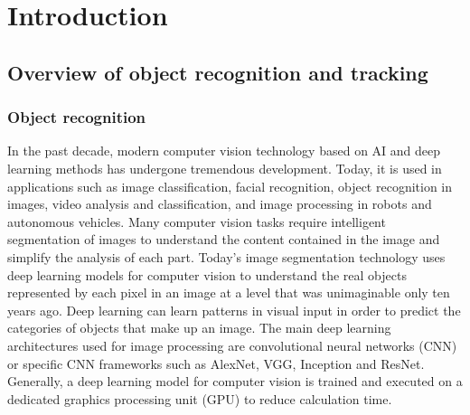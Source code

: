 \chapter{Introduction}\label{chap:intro}

\section{Overview of object recognition and tracking}
\subsection{Object recognition}
In the past decade, modern computer vision technology based on AI and deep learning methods has undergone tremendous development. Today, it is used in applications such as image classification, facial recognition, object recognition in images, video analysis and classification, and image processing in robots and autonomous vehicles. Many computer vision tasks require intelligent segmentation of images to understand the content contained in the image and simplify the analysis of each part. Today's image segmentation technology uses deep learning models for computer vision to understand the real objects represented by each pixel in an image at a level that was unimaginable only ten years ago. Deep learning can learn patterns in visual input in order to predict the categories of objects that make up an image. The main deep learning architectures used for image processing are convolutional neural networks (CNN) or specific CNN frameworks such as AlexNet, VGG, Inception and ResNet. Generally, a deep learning model for computer vision is trained and executed on a dedicated graphics processing unit (GPU) to reduce calculation time.

